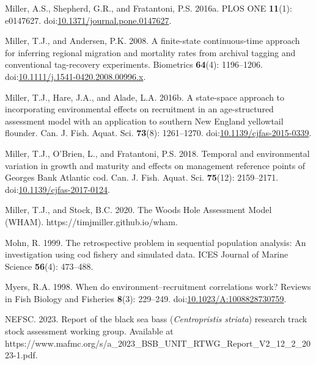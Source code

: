 \documentclass[
]{article}
\newlength{\cslhangindent}
\newlength{\cslentryspacingunit} %
\newenvironment{CSLReferences}[2] %
 {%
  \setlength{\parindent}{0pt}
  \ifodd #1
  \let\oldpar\par
  \def\par{\hangindent=\cslhangindent\oldpar}
  \fi
  \setlength{\parskip}{#2\cslentryspacingunit}
 }%
 {}
\begin{document}
\begin{CSLReferences}{1}{0}
\leavevmode{}%
Miller, A.S., Shepherd, G.R., and Fratantoni, P.S. 2016a. {PLOS} {ONE}
\textbf{11}(1): e0147627.
doi:\href{https://doi.org/10.1371/journal.pone.0147627}{10.1371/journal.pone.0147627}.

\leavevmode{}%
Miller, T.J., and Andersen, P.K. 2008. A finite-state continuous-time
approach for inferring regional migration and mortality rates from
archival tagging and conventional tag-recovery experiments. Biometrics
\textbf{64}(4): 1196--1206.
doi:\href{https://doi.org/10.1111/j.1541-0420.2008.00996.x}{10.1111/j.1541-0420.2008.00996.x}.

\leavevmode{}%
Miller, T.J., Hare, J.A., and Alade, L.A. 2016b. A state-space approach
to incorporating environmental effects on recruitment in an
age-structured assessment model with an application to southern {New
England} yellowtail flounder. Can. J. Fish. Aquat. Sci. \textbf{73}(8):
1261--1270.
doi:\href{https://doi.org/10.1139/cjfas-2015-0339}{10.1139/cjfas-2015-0339}.

\leavevmode{}%
Miller, T.J., O'Brien, L., and Fratantoni, P.S. 2018. Temporal and
environmental variation in growth and maturity and effects on management
reference points of {Georges Bank Atlantic} cod. Can. J. Fish. Aquat.
Sci. \textbf{75}(12): 2159--2171.
doi:\href{https://doi.org/10.1139/cjfas-2017-0124}{10.1139/cjfas-2017-0124}.

\leavevmode{}%
Miller, T.J., and Stock, B.C. 2020. The {Woods Hole Assessment Model}
({WHAM}). https://timjmiller.github.io/wham.

\leavevmode{}%
Mohn, R. 1999. The retrospective problem in sequential population
analysis: An investigation using cod fishery and simulated data. ICES
Journal of Marine Science \textbf{56}(4): 473--488.

\leavevmode{}%
Myers, R.A. 1998. When do environment--recruitment correlations work?
Reviews in Fish Biology and Fisheries \textbf{8}(3): 229--249.
doi:\href{https://doi.org/10.1023/A:1008828730759}{10.1023/A:1008828730759}.

\leavevmode{}%
NEFSC. 2023. Report of the black sea bass (\emph{{C}entropristis}
\emph{striata}) research track stock assessment working group.
{Available} at
https://www.mafmc.org/s/a\_2023\_BSB\_UNIT\_RTWG\_Report\_V2\_12\_2\_2023-1.pdf.


\end{CSLReferences}
\end{document}
